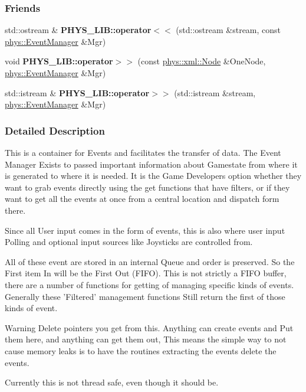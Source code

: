 \subsubsection*{Friends}
\begin{DoxyCompactItemize}
\item 
\hypertarget{classphys_1_1EventManager_ad68113acdef0b428e8180ee4192aca09}{
std::ostream \& {\bfseries PHYS\_\-LIB::operator$<$$<$} (std::ostream \&stream, const \hyperlink{classphys_1_1EventManager}{phys::EventManager} \&Mgr)}
\label{classphys_1_1EventManager_ad68113acdef0b428e8180ee4192aca09}

\item 
\hypertarget{classphys_1_1EventManager_a04e666d9104e325839dc9a6e63cd3c6f}{
void {\bfseries PHYS\_\-LIB::operator$>$$>$} (const \hyperlink{classphys_1_1xml_1_1Node}{phys::xml::Node} \&OneNode, \hyperlink{classphys_1_1EventManager}{phys::EventManager} \&Mgr)}
\label{classphys_1_1EventManager_a04e666d9104e325839dc9a6e63cd3c6f}

\item 
\hypertarget{classphys_1_1EventManager_ac32b5a1ad8a8171298bd544eda444865}{
std::istream \& {\bfseries PHYS\_\-LIB::operator$>$$>$} (std::istream \&stream, \hyperlink{classphys_1_1EventManager}{phys::EventManager} \&Mgr)}
\label{classphys_1_1EventManager_ac32b5a1ad8a8171298bd544eda444865}

\end{DoxyCompactItemize}


\subsubsection{Detailed Description}
This is a container for Events and facilitates the transfer of data. The Event Manager Exists to passed important information about Gamestate from where it is generated to where it is needed. It is the Game Developers option whether they want to grab events directly using the get functions that have filters, or if they want to get all the events at once from a central location and dispatch form there. \par
 Since all User input comes in the form of events, this is also where user input Polling and optional input sources like Joysticks are controlled from. \par
 All of these event are stored in an internal Queue and order is preserved. So the First item In will be the First Out (FIFO). This is not strictly a FIFO buffer, there are a number of functions for getting of managing specific kinds of events. Generally these 'Filtered' management functions Still return the first of those kinds of event. \begin{DoxyWarning}{Warning}
Delete pointers you get from this. Anything can create events and Put them here, and anything can get them out, This means the simple way to not cause memory leaks is to have the routines extracting the events delete the events. 

Currently this is not thread safe, even though it should be. 
\end{DoxyWarning}


